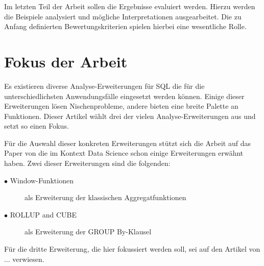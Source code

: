 Im letzten Teil der Arbeit sollen die Ergebnisse evaluiert werden. Hierzu
werden die Beispiele analysiert und mögliche Interpretationen ausgearbeitet. Die
zu Anfang definierten Bewertungskriterien spielen hierbei eine wesentliche Rolle.

\section{Fokus der Arbeit}
Es existieren diverse Analyse-Erweiterungen für SQL die für die unterschiedlichsten
Anwendungsfälle eingesetzt werden können. Einige dieser Erweiterungen lösen 
Nischenprobleme, andere bieten eine breite Palette an Funktionen.
Dieser Artikel wählt drei der vielen Analyse-Erweiterungen aus und setzt so einen
Fokus.

Für die Auswahl dieser konkreten Erweiterungen stützt sich die Arbeit auf das Paper
von \cite{FOTACHE2015243} die im Kontext Data Science schon einige Erweiterungen
erwähnt haben. Zwei dieser Erweiterungen sind die folgenden:

\begin{description}
    \item[$\bullet$ Window-Funktionen] als Erweiterung der klassischen Aggregatfunktionen
    \item[$\bullet$ ROLLUP and CUBE] als Erweiterung der GROUP By-Klausel
\end{description}

Für die dritte Erweiterung, die hier fokussiert werden soll, sei auf den Artikel von ... 
verwiesen.